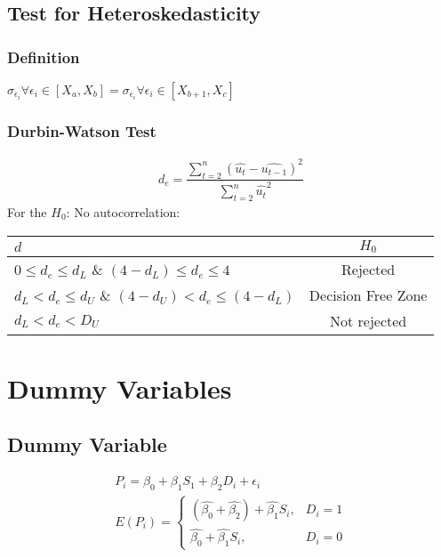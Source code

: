\documentclass[openany, oneside]{book}
\begin{document}
\section{Test for Heteroskedasticity}
\subsection{Definition} $\sigma_{\epsilon_i} \forall  \epsilon_i \in [X_a, X_b] = \sigma_{\epsilon_i} \forall  \epsilon_i \in [X_{b+1}, X_c]$
\subsection{Durbin-Watson Test}
\begin{align}
	d_e = \dfrac{\sum_{t=2}^{n} (\hat{u_t}-\hat{u_{t-1}})^2}{\sum_{t=2}^{n} \hat{u_t}^2}
\end{align}
For the $H_0$: No autocorrelation:
\begin{table}[!h]
	\centering
	\begin{tabular}{l|c}
		$d$ & $H_0$\\
		\hline
		$0 \leq d_e \leq d_L$ \& $(4-d_L) \leq d_e \leq 4$ & Rejected\\
		$d_L < d_e \leq d_U$ \& $(4-d_U) < d_e \leq (4-d_L)$ & Decision Free Zone\\
		$d_L < d_e < D_U$ & Not rejected
	\end{tabular}
\end{table}

\chapter{Dummy Variables}
\section{Dummy Variable}
\begin{align}
	P_i = \beta_0 + \beta_1 S_1 + \beta_2 D_i + \epsilon_i\\
	E(P_i) =
	\begin{cases}
		(\hat{\beta_0}+\hat{\beta_2})+\hat{\beta_1}S_i, &D_i = 1\\
		\hat{\beta_0} + \hat{\beta_1}S_i, &D_i = 0
	\end{cases}
\end{align}

\begin{center}
\end{center}
\end{document}
